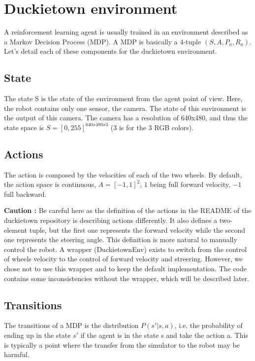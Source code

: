 \chapter{Duckietown environment}

A reinforcement learning agent is usually trained in an environment described as a Markov Decision Process (MDP).
A MDP is basically a 4-tuple $(S, A, P_a, R_a)$.
Let's detail each of these components for the duckietown environment.

\section{State}
The state S is the state of the environment from the agent point of view.
Here, the robot contains only one sensor, the camera.
The state of this environment is the output of this camera.
The camera has a resolution of 640x480, and thus the state space is $S = [0, 255]^{640x480x3}$ (3 is for the 3 RGB colors).

\section{Actions}
The action is composed by the velocities of each of the two wheels.
By default, the action space is continuous, $A = [-1, 1]^2$, $1$ being full forward velocity, $-1$ full backward.

\textbf{Caution :}
Be careful here as the definition of the actions in the README of the duckietown repository is describing actions differently.
It also defines a two-element tuple, but the first one represents the forward velocity while the second one represents the steering angle.
This definition is more natural to manually control the robot.
A wrapper (DuckietownEnv) exists to switch from the control of wheels velocity to the control of forward velocity and streering.
However, we chose not to use this wrapper and to keep the default implementation.
The code contains some inconsistencies without the wrapper, which will be described later.

\section{Transitions}
The transitions of a MDP is the distribution $P(s'| s, a)$, i.e. the probability of ending up in the state $s'$ if the agent is in the state s and take the action a.
This is typically a point where the transfer from the simulator to the robot may be harmful.

